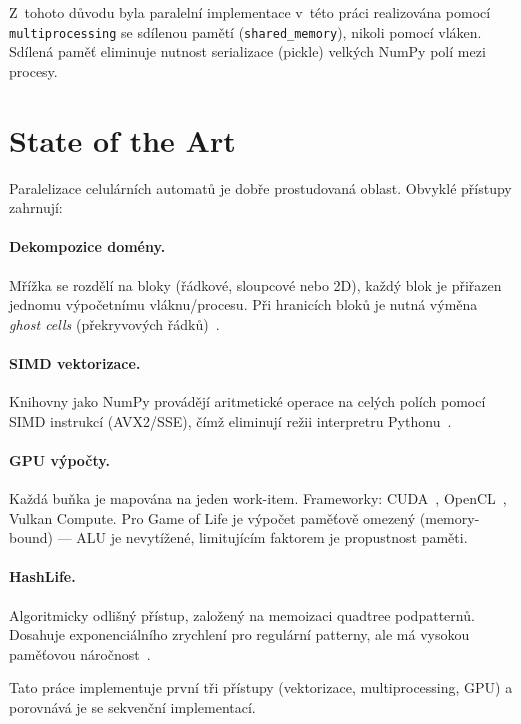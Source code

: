 \documentclass[12pt,a4paper]{article}
\begin{document}
Z~tohoto důvodu byla paralelní implementace v~této práci realizována pomocí \texttt{multiprocessing} se sdílenou pamětí (\texttt{shared\_memory}), nikoli pomocí vláken. Sdílená paměť eliminuje nutnost serializace (pickle) velkých NumPy polí mezi procesy.

\section{State of the Art}

Paralelizace celulárních automatů je dobře prostudovaná oblast. Obvyklé přístupy zahrnují:

\paragraph{Dekompozice domény.} Mřížka se rozdělí na bloky (řádkové, sloupcové nebo 2D), každý blok je přiřazen jednomu výpočetnímu vláknu/procesu. Při hranicích bloků je nutná výměna \emph{ghost cells} (překryvových řádků)~\cite{quinn2003}.

\paragraph{SIMD vektorizace.} Knihovny jako NumPy provádějí aritmetické operace na celých polích pomocí SIMD instrukcí (AVX2/SSE), čímž eliminují režii interpretru Pythonu~\cite{harris2020}.

\paragraph{GPU výpočty.} Každá buňka je mapována na jeden work-item. Frameworky: CUDA~\cite{nickolls2008}, OpenCL~\cite{stone2010}, Vulkan Compute. Pro Game of Life je výpočet paměťově omezený (memory-bound) --- ALU je nevytížené, limitujícím faktorem je propustnost paměti.

\paragraph{HashLife.} Algoritmicky odlišný přístup, založený na memoizaci quadtree podpatternů. Dosahuje exponenciálního zrychlení pro regulární patterny, ale má vysokou paměťovou náročnost~\cite{gosper1984}.

Tato práce implementuje první tři přístupy (vektorizace, multiprocessing, GPU) a porovnává je se sekvenční implementací.
\end{document}
